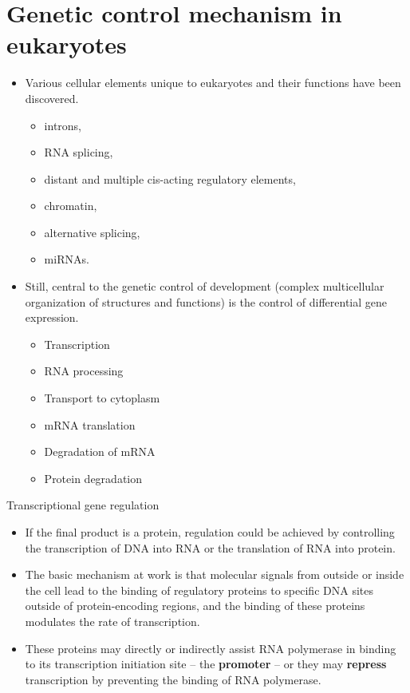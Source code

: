 \documentclass[11pt,dvipsnames,ignorenonframetext,aspectratio=169]{beamer}
\providecommand{\tightlist}{%
  \setlength{\itemsep}{0pt}\setlength{\parskip}{0pt}}
\begin{document}
\hypertarget{genetic-control-mechanism-in-eukaryotes}{%
\section{Genetic control mechanism in
eukaryotes}\label{genetic-control-mechanism-in-eukaryotes}}

\begin{frame}{}
\protect\hypertarget{section-9}{}
\begin{itemize}
\tightlist
\item
  Various cellular elements unique to eukaryotes and their functions
  have been discovered.

  \begin{itemize}
  \tightlist
  \item
    introns,
  \item
    RNA splicing,
  \item
    distant and multiple cis-acting regulatory elements,
  \item
    chromatin,
  \item
    alternative splicing,
  \item
    miRNAs.
  \end{itemize}
\item
  Still, central to the genetic control of development (complex
  multicellular organization of structures and functions) is the control
  of differential gene expression.

  \begin{itemize}
  \tightlist
  \item
    Transcription
  \item
    RNA processing
  \item
    Transport to cytoplasm
  \item
    mRNA translation
  \item
    Degradation of mRNA
  \item
    Protein degradation
  \end{itemize}
\end{itemize}
\end{frame}

\begin{frame}{Transcriptional gene regulation}
\protect\hypertarget{transcriptional-gene-regulation}{}
\begin{itemize}
\tightlist
\item
  If the final product is a protein, regulation could be achieved by
  controlling the transcription of DNA into RNA or the translation of
  RNA into protein.
\item
  The basic mechanism at work is that molecular signals from outside or
  inside the cell lead to the binding of regulatory proteins to specific
  DNA sites outside of protein-encoding regions, and the binding of
  these proteins modulates the rate of transcription.
\item
  These proteins may directly or indirectly assist RNA polymerase in
  binding to its transcription initiation site -- the \textbf{promoter}
  -- or they may \textbf{repress} transcription by preventing the
  binding of RNA polymerase.
\end{itemize}
\end{frame}
\end{document}

